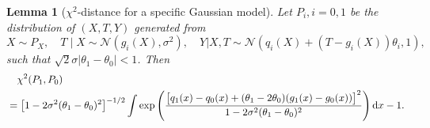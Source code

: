 \documentclass{article}
\def\gN{{\mathcal{N}}}
\newcommand{\dd}{\textup{d}}
\newtheorem{lemma}{Lemma}[section]
\begin{document}
\begin{lemma}[$\chi^2$-distance for a specific Gaussian model]
    \label{lemma:chi2-gaussian-mixture}
    Let $P_i, i=0,1$ be the distribution of $(X,T,Y)$ generated from 
    \begin{equation}
        \label{eq:chi2-gaussian-mixture}
        X \sim P_X,\quad T\mid X \sim \gN(g_i(X),\sigma^2),\quad Y|X,T \sim \gN(q_i(X)+(T-g_i(X))\theta_i, 1),
    \end{equation}
    such that $\sqrt{2}\sigma|\theta_1-\theta_0| < 1$. Then 
    \begin{equation}
        \notag
        \begin{aligned}
            &\quad \chi^2(P_1,P_0) \\
        &= \big[1-2\sigma^2(\theta_1-\theta_0)^2\big]^{-1/2} \int \exp\left(\frac{\big[q_1(x)-q_0(x)+(\theta_1-2\theta_0)(g_1(x)-g_0(x)) \big]^2}{1-2\sigma^2(\theta_1-\theta_0)^2}\right) \dd x - 1.
        \end{aligned}
    \end{equation}
\end{lemma}
\end{document}
